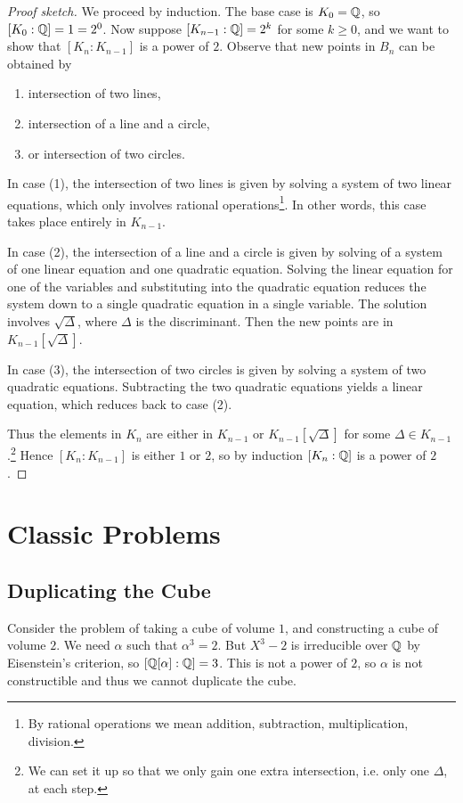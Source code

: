 \begin{proof}[Proof sketch]
  We proceed by induction. The base case is
  $K_0 = \mathbb{Q}$, so $[K_0 : \mathbb{Q}] = 1 = 2^0$. Now suppose
  $[K_{n - 1} : \mathbb{Q}] = 2^k$ for some $k \ge 0$, and
  we want to show that $[K_n : K_{n - 1}]$ is a power
  of $2$. Observe that new points in $B_n$ can be
  obtained by
  \begin{enumerate}
    \item intersection of two lines,
    \item intersection of a line and a circle,
    \item or intersection of two circles.
  \end{enumerate}
  In case (1), the intersection of two lines is
  given by solving a system of two linear equations,
  which only involves rational operations\footnote{By rational operations we mean addition, subtraction, multiplication, division.}.
  In other words, this case takes place entirely in
  $K_{n - 1}$.

  In case (2), the intersection of a line
  and a circle is given by solving of a system of one
  linear equation and one quadratic equation. Solving
  the linear equation for one of the variables and
  substituting into the quadratic equation reduces
  the system down to a single quadratic equation
  in a single variable. The solution involves
  $\sqrt{\Delta}$, where $\Delta$ is the discriminant.
  Then the new points are in $K_{n - 1}[\sqrt{\Delta}]$.

  In case (3), the intersection of two circles is
  given by solving a system of two quadratic equations.
  Subtracting the two quadratic equations yields a
  linear equation, which reduces back to case (2).

  Thus the elements in $K_n$ are either in $K_{n - 1}$
  or $K_{n - 1}[\sqrt{\Delta}]$ for some
  $\Delta \in K_{n - 1}$.\footnote{We can set it up so that we only gain one extra intersection, i.e. only one $\Delta$, at each step.} Hence $[K_n : K_{n - 1}]$
  is either $1$ or $2$, so by induction $[K_n : \mathbb{Q}]$ is
  a power of $2$.
\end{proof}

\section{Classic Problems}
\subsection{Duplicating the Cube}
Consider the problem of taking a cube of volume $1$, and
constructing a cube of volume $2$. We need $\alpha$
such that $\alpha^3 = 2$. But $X^3 - 2$ is irreducible
over $\mathbb{Q}$ by Eisenstein's criterion, so
$[\mathbb{Q}[\alpha] : \mathbb{Q}] = 3$. This is not a power of $2$,
so $\alpha$ is not constructible and thus we cannot
duplicate the cube.

